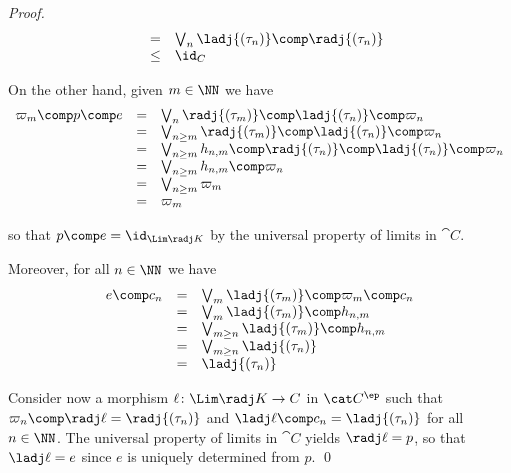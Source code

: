 \begin{proof}
\[\begin{array}{l l l}
& =
& \bigvee_n \ladj{(\tau_n)} \comp \radj{(\tau_n)}
\\

& \leq
& \id_{C}
\end{array}
\]

\noindent
On the other hand, given $m \in \NN$ we have
\[
\begin{array}{l l l}
  \varpi_m \comp p \comp e
& =
& \bigvee_{n} \radj{(\tau_m)} \comp \ladj{(\tau_n)} \comp \varpi_n
\\

& =
& \bigvee_{n \geq m} \radj{(\tau_m)} \comp \ladj{(\tau_n)} \comp \varpi_n
\\

& =
& \bigvee_{n \geq m} h_{n,m} \comp \radj{(\tau_n)} \comp \ladj{(\tau_n)} \comp \varpi_n
\\

& =
& \bigvee_{n \geq m} h_{n,m} \comp \varpi_n
\\

& =
& \bigvee_{n \geq m} \varpi_m
\\

& =
& \varpi_m
\end{array}
\]

\noindent
so that $p \comp e = \id_{\Lim \radj K}$
by the universal property of limits in $\cat C$.

Moreover, for all $n \in \NN$ we have
\[
\begin{array}{l l l}
  e \comp c_n
& =
& \bigvee_m \ladj{(\tau_m)} \comp \varpi_m \comp c_n
\\

& =
& \bigvee_m \ladj{(\tau_m)} \comp h_{n,m}
\\

& =
& \bigvee_{m\geq n} \ladj{(\tau_m)} \comp h_{n,m}
\\

& =
& \bigvee_{m\geq n} \ladj{(\tau_n)}
\\

& =
& \ladj{(\tau_n)}
\end{array}
\]

Consider now a morphism $\ell \colon \Lim \radj K \to C$
in $\cat C^\ep$
such that 
$\varpi_n \comp \radj\ell = \radj{(\tau_n)}$
and
$\ladj\ell \comp c_n = \ladj{(\tau_n)}$
for all $n \in \NN$.
The universal property of limits in $\cat C$
yields $\radj\ell = p$, so that $\ladj\ell = e$
since $e$ is uniquely determined from $p$.
\qed
\end{proof}


